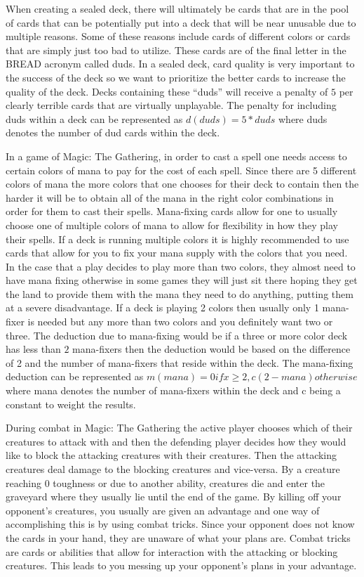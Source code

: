 \documentclass[12pt, letterpaper]{article}
\begin{document}
    When creating a sealed deck, there will ultimately be cards that are in the pool of cards that can be potentially put
into a deck that will be near unusable due to multiple reasons. Some of these reasons include cards of different colors or
cards that are simply just too bad to utilize. These cards are of the final letter in the BREAD acronym called duds. In a
sealed deck, card quality is very important to the success of the deck so we want to prioritize the better cards to
increase the quality of the deck. Decks containing these “duds” will receive a penalty of $5$ per clearly terrible cards
that are virtually unplayable. The penalty for including duds within a deck can be represented as $d(duds) = 5 * duds$
where duds denotes the number of dud cards within the deck.

    In a game of Magic: The Gathering, in order to cast a spell one needs access to certain colors of mana to pay for the
cost of each spell. Since there are 5 different colors of mana the more colors that one chooses for their deck to contain
then the harder it will be to obtain all of the mana in the right color combinations in order for them to cast their spells.
Mana-fixing cards allow for one to usually choose one of multiple colors of mana to allow for flexibility in how they play
their spells. If a deck is running multiple colors it is highly recommended to use cards that allow for you to fix your
mana supply with the colors that you need. In the case that a play decides to play more than two colors, they almost need
to have mana fixing otherwise in some games they will just sit there hoping they get the land to provide them with the
mana they need to do anything, putting them at a severe disadvantage. If a deck is playing 2 colors then usually only 1
mana-fixer is needed but any more than two colors and you definitely want two or three. The deduction due to mana-fixing
would be if a three or more color deck has less than $2$ mana-fixers then the deduction would be based on the difference of
2 and the number of mana-fixers that reside within the deck. The mana-fixing deduction can be represented as $m(mana) = 0
if x \ge 2, c(2 - mana) otherwise$ where mana denotes the number of mana-fixers within the deck and c being a constant to
weight the results.

    During combat in Magic: The Gathering the active player chooses which of their creatures to attack with and then the
defending player decides how they would like to block the attacking creatures with their creatures. Then the attacking
creatures deal damage to the blocking creatures and vice-versa. By a creature reaching 0 toughness or due to another
ability, creatures die and enter the graveyard where they usually lie until the end of the game. By killing off your
opponent’s creatures, you usually are given an advantage and one way of accomplishing this is by using combat tricks.
Since your opponent does not know the cards in your hand, they are unaware of what your plans are. Combat tricks are cards
or abilities that allow for interaction with the attacking or blocking creatures. This leads to you messing up your
opponent’s plans in your advantage.
\end{document}
